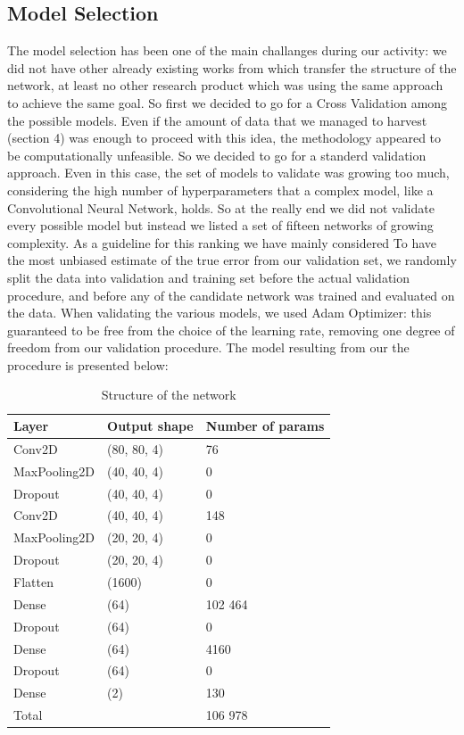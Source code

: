 \subsection{Model Selection}
The model selection has been one of the main challanges during our activity: we did not have other already existing works from which transfer the structure of the network, at least no other research product which was using the same approach to achieve the same goal. So first we decided to go for a Cross Validation among the possible models. Even if the amount of data that we managed to harvest (section 4) was enough to proceed with this idea, the methodology appeared to be computationally unfeasible. So we decided to go for a standerd validation approach. Even in this case, the set of models to validate was growing too much, considering the high number of hyperparameters that a complex model, like a Convolutional Neural Network, holds. So at the really end we did not validate every possible model but instead we listed a set of fifteen networks of growing complexity. As a guideline for this ranking we have mainly considered 
To have the most unbiased estimate of the true error from our validation set, we randomly split the data into validation and training set before the actual validation procedure, and before any of the candidate network was trained and evaluated on the data.
When validating the various models, we used Adam Optimizer: this guaranteed to be free from the choice of the learning rate, removing one degree of freedom from our validation procedure.
The model resulting from our the procedure is presented below:
\\
\begin{table}[]
\begin{center}
\begin{tabular}{l|l|l}
Layer        & Output shape & Number of params \\
\hline
Conv2D       & (80, 80, 4)  & 76               \\
\hline
MaxPooling2D & (40, 40, 4)  & 0                \\
\hline
Dropout      & (40, 40, 4)  & 0                \\
\hline
Conv2D       & (40, 40, 4)  & 148              \\
\hline
MaxPooling2D & (20, 20, 4)  & 0                \\
\hline
Dropout      & (20, 20, 4)  & 0                \\
\hline
Flatten      & (1600)         & 0                \\
\hline
Dense        & (64)           & 102 464          \\
\hline
Dropout      & (64)           & 0                \\
\hline
Dense        & (64)           & 4160             \\
\hline
Dropout      & (64)           & 0                \\
\hline
Dense        & (2)            & 130              \\
\hline
\multicolumn{2}{l}{Total}   & 106 978         
\end{tabular}
\end{center}
\caption{Structure of the network}
\end{table}
